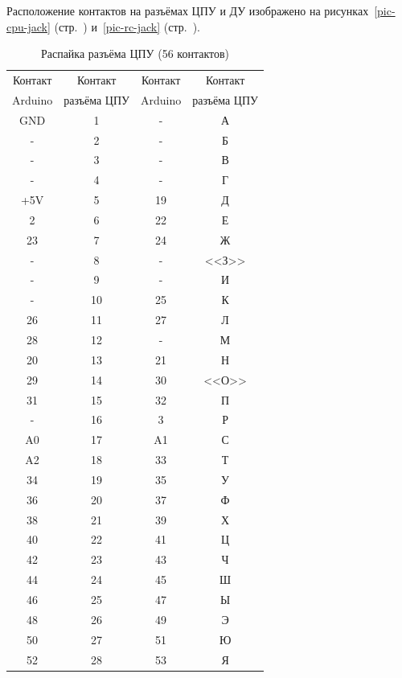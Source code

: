 \documentclass[10pt, a4paper, twocolumn]{article}
\begin{document}
Расположение контактов на разъёмах ЦПУ и ДУ изображено на рисунках~\ref{pic-cpu-jack} (стр.~\pageref{pic-cpu-jack}) и~\ref{pic-rc-jack} (стр.~\pageref{pic-rc-jack}).

\begin{table}
\begin{center}
\caption{Распайка разъёма ЦПУ (56 контактов)}
\begin{tabular}{cccc}
\hline \hline
Контакт & Контакт & Контакт & Контакт \\
Arduino & разъёма ЦПУ & Arduino & разъёма ЦПУ \\
\hline
GND & 1 & - & А \\
- & 2 & - & Б \\
- & 3 & - & В \\
- & 4 & - & Г \\
+5V & 5 & 19 & Д \\
2 & 6 & 22 & Е \\
23 & 7 & 24 & Ж \\
- & 8 & - & <<З>> \\
- & 9 & - & И \\
- & 10 & 25 & К \\
26 & 11 & 27 & Л \\
28 & 12 & - & М \\
20 & 13 & 21 & Н \\
29 & 14 & 30 & <<О>> \\
31 & 15 & 32 & П \\
- & 16 & 3 & Р \\
A0 & 17 & A1 & С \\
A2 & 18 & 33 & Т \\
34 & 19 & 35 & У \\
36 & 20 & 37 & Ф \\
38 & 21 & 39 & Х \\
40 & 22 & 41 & Ц \\
42 & 23 & 43 & Ч \\
44 & 24 & 45 & Ш \\
46 & 25 & 47 & Ы \\
48 & 26 & 49 & Э \\
50 & 27 & 51 & Ю \\
52 & 28 & 53 & Я \\
\hline \hline
\end{tabular}
\label{tab_cpu_wires}
\end{center}
\end{table}
\end{document}

